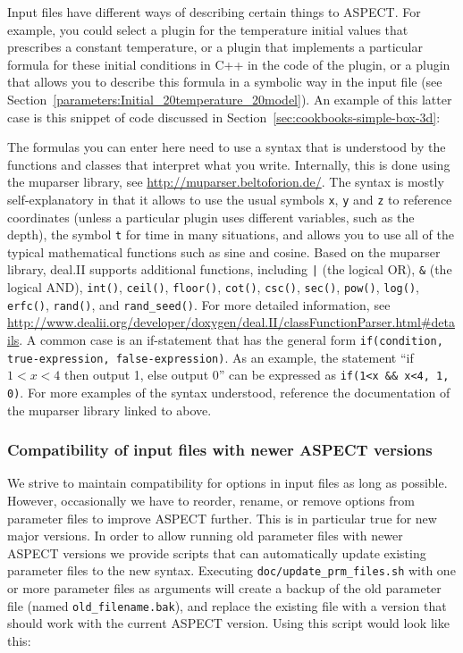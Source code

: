 \documentclass{article}
\newcommand{\aspect}{\textsc{ASPECT}}
\begin{document}
Input files have different ways of describing certain things to \aspect{}. For
example, you could select a plugin for the temperature initial values that
prescribes a constant temperature, or a
plugin that implements a particular formula for these initial conditions in
C++ in the code of the plugin, or a
plugin that allows you to describe this formula in a symbolic way in the input file
(see Section~\ref{parameters:Initial_20temperature_20model}). An example of this latter
case is this snippet of code discussed in
Section~\ref{sec:cookbooks-simple-box-3d}:
%

%
The formulas you can enter here need to use a syntax that is understood by the
functions and classes that interpret what you write. Internally, this is done
using the muparser library, see \url{http://muparser.beltoforion.de/}. The
syntax is mostly self-explanatory in that it allows to use the usual symbols
\texttt{x}, \texttt{y} and \texttt{z} to reference coordinates (unless a
particular plugin uses different variables, such as the depth), the symbol
\texttt{t} for time in many situations, and allows you to use all of the
typical mathematical functions such as sine and cosine. Based on the muparser 
library, deal.II supports additional functions, including \texttt{|} (the logical OR), \texttt{\&} (the logical AND),
\texttt{int()}, \texttt{ceil()}, \texttt{floor()}, \texttt{cot()}, 
\texttt{csc()}, \texttt{sec()}, \texttt{pow()}, \texttt{log()}, 
\texttt{erfc()}, \texttt{rand()}, and \texttt{rand\_seed()}. 
For more detailed information, see 
\url{http://www.dealii.org/developer/doxygen/deal.II/classFunctionParser.html#details}. 
A common case is an if-statement that has the general form
\texttt{if(condition, true-expression, false-expression)}. As an example, 
the statement ``if $1<x<4$ then output 1, else output 0'' can be expressed as
\texttt{if(1<x \&\& x<4, 1, 0)}. For more examples of
the syntax understood, reference the documentation of the muparser library
linked to above.

\subsubsection{Compatibility of input files with newer \aspect{} versions}

We strive to maintain compatibility for options in input files as long as
possible. However, occasionally we have to reorder, rename, or remove options
from parameter files to improve \aspect{} further. This is in particular true
for new major versions. In order to allow running old parameter files with
newer \aspect{} versions we provide scripts that can automatically update
existing parameter files to the new syntax. Executing
\texttt{doc/update\_prm\_files.sh} with one or more parameter files as
arguments will create a backup of the old parameter file (named
\texttt{old\_filename.bak}), and replace the existing file with a version that
should work with the current \aspect{} version. Using this script would look
like this:
\end{document}
